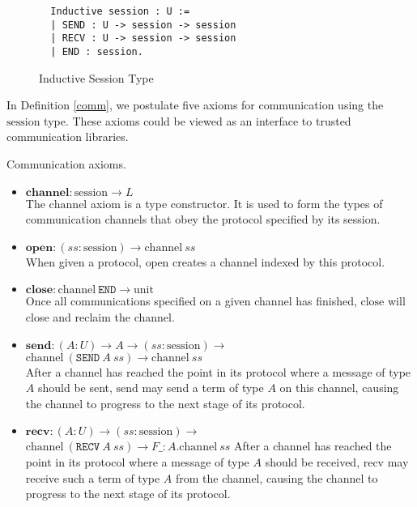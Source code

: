 \documentclass[sigplan,screen,review,authordraft]{acmart}
\newcommand{\unit}{\text{unit}}
\newcommand{\session}{\text{session}}
\newcommand{\channel}{\text{channel}}
\newcommand{\open}{\text{open}}
\newcommand{\close}{\text{close}}
\newcommand{\send}{\text{send}}
\newcommand{\recv}{\text{recv}}
\newcommand{\SEND}{\texttt{SEND}}
\newcommand{\RECV}{\texttt{RECV}}
\newcommand{\END}{\texttt{END}}
\begin{document}
\begin{figure}[h]
  \caption{Inductive Session Type}
  \begin{verbatim}
  Inductive session : U :=
  | SEND : U -> session -> session
  | RECV : U -> session -> session
  | END : session.
  \end{verbatim}
  \label{session}
  \Description{}
\end{figure}

In Definition \ref{comm}, we postulate five axioms for communication using the $\session$ type. These axioms could be viewed as an interface to trusted communication libraries.

\begin{definition}
  Communication axioms.
  \begin{itemize}
    \item $\textbf{channel} : \session \rightarrow L$ \\
          The $\channel$ axiom is a type constructor. It is used to form the types of communication channels that obey the protocol specified by its session.
    \item $\textbf{open} : (ss : \session) \rightarrow \channel\ ss$ \\
          When given a protocol, $\open$ creates a channel indexed by this protocol.
    \item $\textbf{close} : \channel\ \END \rightarrow \unit$ \\
          Once all communications specified on a given channel has finished, $\close$ will close and reclaim the channel.
    \item $\textbf{send} : (A : U) \rightarrow A \rightarrow (ss : \session) \rightarrow$ \\
          \phantom{send : (A :)}
          $\channel\ (\SEND\ A\ ss) \rightarrow \channel\ ss$ \\
          After a channel has reached the point in its protocol where a message of type $A$ should be sent, $\send$ may send a term of type $A$ on this channel, causing the channel to progress to the next stage of its protocol.
    \item $\textbf{recv} : (A : U) \rightarrow (ss : \session) \rightarrow $ \\
          \phantom{recv : (A :)}
          $\channel\ (\RECV\ A\ ss) \rightarrow F \_:A.\channel\ ss$
          After a channel has reached the point in its protocol where a message of type $A$ should be received, $\recv$ may receive such a term of type $A$ from the channel, causing the channel to progress to the next stage of its protocol.
  \end{itemize}
  \label{comm}
\end{definition}
\end{document}
